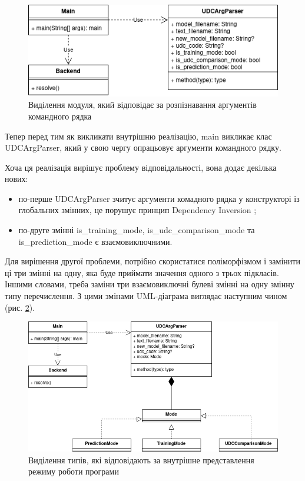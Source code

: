 \documentclass[14pt]{extarticle}
\begin{document}
  \begin{figure}[H]
    \centering
    \includegraphics{io_uml2.drawio.png}    
    \caption{Виділення модуля,
    який відповідає за розпізнавання аргументів командного рядка}
    \label{fig:io_uml2}
  \end{figure}

  Тепер перед тим як викликати внутрішню реалізацію,
  main викликає клас UDCArgParser,
  який у свою чергу опрацьовує аргументи командного рядку.
  
  Хоча ця реалізація вирішує проблему відповідальності, вона додає декілька нових:
  \begin{itemize}[labelindent=\dimexpr{}\relax, leftmargin=*]
    \item по-перше UDCArgParser зчитує аргументи комадного рядка
    у конструкторі із глобальних змінних,
    це порушує принцип Dependency Inversion \cite{DI_wiki, SOLID_wiki};
    \item по-друге змінні is\_training\_mode, is\_udc\_comparison\_mode та \\ is\_prediction\_mode є взаємовиключними.
  \end{itemize}

  Для вирішення другої проблеми, потрібно скористатися поліморфізмом
  \cite{Polymorphism_wiki, Subtyping_wiki, Dynamic_dispatch_wiki}
  і замінити ці три змінні на одну,
  яка буде приймати значення одного з трьох підкласів.
  Іншими словами, треба заміни три взаємовиключні булеві змінні
  на одну змінну типу перечислення.
  З цими змінами UML-діаграма виглядає наступним чином (рис. \ref{fig:io_uml3}).

  \begin{figure}[H]
    \centering
    \includegraphics[width=\textwidth]{io_uml3.drawio.png}    
    \caption{Виділення типів,
    які відповідають за внутрішне представлення режиму роботи програми}
    \label{fig:io_uml3}
  \end{figure}
  
\end{document}
